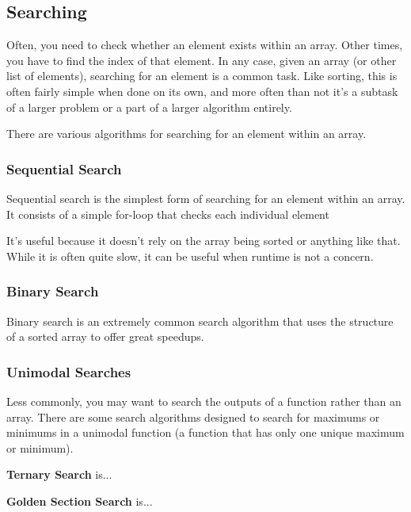 \subsection{Searching}

Often, you need to check whether an element exists within an array. Other times, you have to find the index of that element. In any case, given an array (or other list of elements), searching for an element is a common task. Like sorting, this is often fairly simple when done on its own, and more often than not it's a subtask of a larger problem or a part of a larger algorithm entirely.

There are various algorithms for searching for an element within an array.

\subsubsection{Sequential Search}

Sequential search is the simplest form of searching for an element within an array. It consists of a simple for-loop that checks each individual element 

It's useful because it doesn't rely on the array being sorted or anything like that. While it is often quite slow, it can be useful when runtime is not a concern.

\subsubsection{Binary Search}

Binary search is an extremely common search algorithm that uses the structure of a sorted array to offer great speedups.

\subsubsection{Unimodal Searches}

Less commonly, you may want to search the outputs of a function rather than an array. There are some search algorithms designed to search for maximums or minimums in a unimodal function (a function that has only one unique maximum or minimum).

\textbf{Ternary Search} is...

\textbf{Golden Section Search} is...